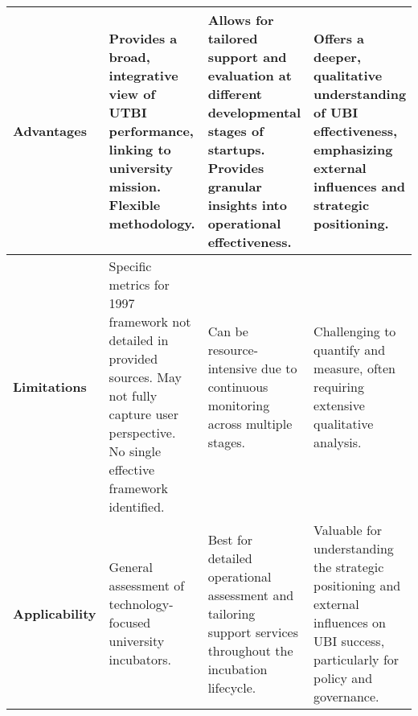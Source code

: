 \documentclass[../Main.tex]{subfiles}
\begin{document}
\begin{longtable}{|p{}|p{}|p{}|p{}|}
    \hline
    \textbf{Advantages}         & Provides a broad, integrative view of UTBI performance, linking to university mission. Flexible methodology.                                            & Allows for tailored support and evaluation at different developmental stages of startups. Provides granular insights into operational effectiveness.              & Offers a deeper, qualitative understanding of UBI effectiveness, emphasizing external influences and strategic positioning.          \\
    \hline
    \textbf{Limitations}        & Specific metrics for 1997 framework not detailed in provided sources. May not fully capture user perspective. No single effective framework identified. & Can be resource-intensive due to continuous monitoring across multiple stages.                                                                                    & Challenging to quantify and measure, often requiring extensive qualitative analysis.                                                 \\
    \hline
    \textbf{Applicability}      & General assessment of technology-focused university incubators.                                                                                         & Best for detailed operational assessment and tailoring support services throughout the incubation lifecycle.                                                      & Valuable for understanding the strategic positioning and external influences on UBI success, particularly for policy and governance. \\
    \hline
\end{longtable}
\end{document}
